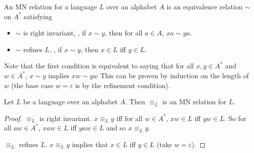 \begin{definition} \label{def:mn}
    An MN relation for a language $L$ over an alphabet $A$ is an equivalence
    relation $\sim$ on $A^*$ satisfying
    \begin{itemize}
        \item $\sim$ is right invariant, \ie, if $x \sim y$, then for all
        $a \in A$, $xa \sim ya$.
        \item $\sim$ refines $L$, \ie, if $x \sim y$, then $x \in L$ iff
        $y \in L$.
    \end{itemize}
\end{definition}
Note that the first condition is equivalent to saying that for all
$x, y \in A^*$ and $w \in A^*$, $x \sim y$ implies $xw \sim yw$
This can be proven by induction on the length of $w$ (the base case
$w = \varepsilon$ is by the refinement condition).

\begin{proposition} \label{thm:mn:canonical}
   Let $L$ be a language over an alphabet $A$.
    Then $\equiv_L$ is an MN relation for $L$.
\end{proposition}
\begin{proof}
    $\equiv_L$ is right invariant.
    $x \equiv_L y$ iff for all $w \in A^*$, $xw \in L$ iff $yw \in L$.
    So for all $aw \in A^*$, $xaw \in L$ iff $yaw \in L$ and so
    $x \equiv_L y$.

    $\equiv_L$ refines $L$.
    $x \equiv_L y$ implies that $x \in L$ iff $y \in L$ (take
    $w = \varepsilon$).
\end{proof}

